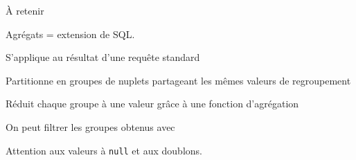 \begin{frame}{À retenir}

Agrégats = extension de SQL.

\vfill

\begin{redbullet}
  \item  S'applique au \alert{résultat} d'une requête standard
  \item Partitionne en groupes de nuplets partageant les mêmes valeurs de regroupement
  \item Réduit chaque groupe à une valeur grâce à une fonction d'agrégation
  \item On peut filtrer les groupes obtenus avec 
\end{redbullet}

\vfill

\begin{blocgauche}
Attention aux valeurs  à \texttt{null} et aux doublons.
\end{blocgauche}
\end{frame}

